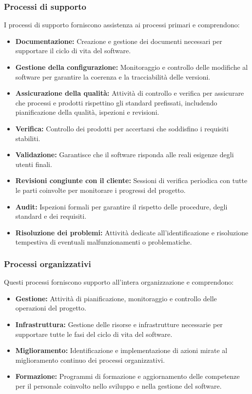 \subsubsection{Processi di supporto}
I processi di supporto forniscono assistenza ai processi primari e comprendono:
\begin{itemize}
    \item \textbf{Documentazione:} Creazione e gestione dei documenti necessari per supportare il ciclo di vita del software.
    \item \textbf{Gestione della configurazione:} Monitoraggio e controllo delle modifiche al software per garantire la coerenza e la tracciabilità delle versioni.
    \item \textbf{Assicurazione della qualità:} Attività di controllo e verifica per assicurare che processi e prodotti rispettino gli standard prefissati, includendo pianificazione della qualità, ispezioni e revisioni.
    \item \textbf{Verifica:} Controllo dei prodotti per accertarsi che soddisfino i requisiti stabiliti.
    \item \textbf{Validazione:} Garantisce che il software risponda alle reali esigenze degli utenti finali.
    \item \textbf{Revisioni congiunte con il cliente:} Sessioni di verifica periodica con tutte le parti coinvolte per monitorare i progressi del progetto.
    \item \textbf{Audit:} Ispezioni formali per garantire il rispetto delle procedure, degli standard e dei requisiti.
    \item \textbf{Risoluzione dei problemi:} Attività dedicate all'identificazione e risoluzione tempestiva di eventuali malfunzionamenti o problematiche.
\end{itemize}

\subsubsection{Processi organizzativi}
Questi processi forniscono supporto all’intera organizzazione e comprendono:
\begin{itemize}
    \item \textbf{Gestione:} Attività di pianificazione, monitoraggio e controllo delle operazioni del progetto.
    \item \textbf{Infrastruttura:} Gestione delle risorse e infrastrutture necessarie per supportare tutte le fasi del ciclo di vita del software.
    \item \textbf{Miglioramento:} Identificazione e implementazione di azioni mirate al miglioramento continuo dei processi organizzativi.
    \item \textbf{Formazione:} Programmi di formazione e aggiornamento delle competenze per il personale coinvolto nello sviluppo e nella gestione del software.
\end{itemize}
